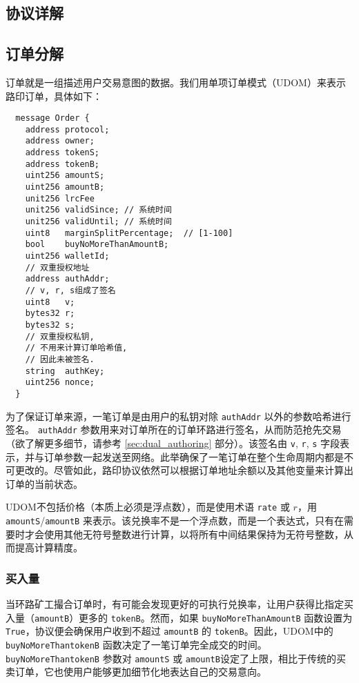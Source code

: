 \documentclass[UTF8]{ctexart}
\begin{document}
\begin{multicols}{2}
\section{协议详解\label{sec:protocol}}

\subsection{订单分解\label{anatomy}}
订单就是一组描述用户交易意图的数据。我们用单项订单模式（UDOM）来表示路印订单，具体如下：

\begin{verbatim}
  message Order {
    address protocol;
    address owner;
    address tokenS;
    address tokenB;
    uint256 amountS;
    uint256 amountB;
    unit256 lrcFee
    unit256 validSince; // 系统时间
    unit256 validUntil; // 系统时间
    uint8   marginSplitPercentage;  // [1-100]
    bool    buyNoMoreThanAmountB;
    uint256 walletId;
    // 双重授权地址
    address authAddr;
   	// v, r, s组成了签名
    uint8   v;       
    bytes32 r;
    bytes32 s;
    // 双重授权私钥,
    // 不用来计算订单哈希值,
    // 因此未被签名.
    string  authKey; 
    uint256 nonce;         
  }
\end{verbatim}


为了保证订单来源，一笔订单是由用户的私钥对除 \verb|authAddr| 以外的参数哈希进行签名。 \verb|authAddr| 参数用来对订单所在的订单环路进行签名，从而防范抢先交易（欲了解更多细节，请参考 \ref{sec:dual_authoring} 部分）。该签名由 \verb|v|, \verb|r|, \verb|s| 字段表示，并与订单参数一起发送至网络。此举确保了一笔订单在整个生命周期内都是不可更改的。尽管如此，路印协议依然可以根据订单地址余额以及其他变量来计算出订单的当前状态。



UDOM不包括价格（本质上必须是浮点数），而是使用术语 \verb|rate| 或 $r$，用 \verb|amountS|/\verb|amountB| 来表示。该兑换率不是一个浮点数，而是一个表达式，只有在需要时才会使用其他无符号整数进行计算，以将所有中间结果保持为无符号整数，从而提高计算精度。 

\subsubsection{买入量}

当环路矿工撮合订单时，有可能会发现更好的可执行兑换率，让用户获得比指定买入量（\verb|amountB|）更多的 \verb|tokenB|。然而，如果 \verb|buyNoMoreThanAmountB| 函数设置为 \verb|True|，协议便会确保用户收到不超过 \verb|amountB| 的 \verb|tokenB|。因此，UDOM中的 \verb|buyNoMoreThantokenB| 函数决定了一笔订单完全成交的时间。\verb|buyNoMoreThantokenB| 参数对 \verb|amountS| 或 \verb|amountB|设定了上限，相比于传统的买卖订单，它也使用户能够更加细节化地表达自己的交易意向。


\end{multicols}
\end{document}
